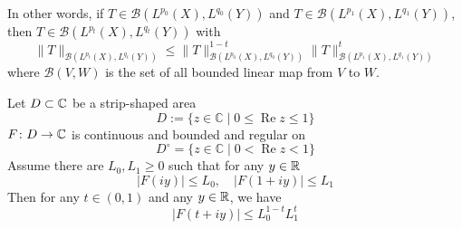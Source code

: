 \begin{rmk}
	In other words, if $T \in \mathcal{B}\left(L^{p_0}(X), L^{q_0}(Y)\right)$ and $T \in \mathcal{B}\left(L^{p_1}(X), L^{q_1}(Y)\right)$, then $T \in \mathcal{B}\left(L^{p_t}(X), L^{q_t}(Y)\right)$ with
	\begin{equation*}
		\|T\|_{\mathcal{B}\left(L^{p_t}(X), L^{q_t}(Y)\right)} \leq\|T\|_{\mathcal{B}\left(L^{p_0}(X), L^{q_0}(Y)\right)}^{1-t}\|T\|_{\mathcal{B}\left(L^{p_1}(X), L^{q_1}(Y)\right)}^t
	\end{equation*}
	where $\mathcal{B}(V,W)$ is the set of all bounded linear map from $V$ to $W$.
\end{rmk}

\begin{prop}\label{prop:threelines}
	Let $D \subset \mathbb{C}$ be a strip-shaped area
	\begin{equation*}
		D:=\{z \in \mathbb{C} \mid 0 \leq \operatorname{Re} z \leq 1\}
	\end{equation*}
	$F \colon D \rightarrow \mathbb{C}$ is continuous and bounded and regular on
	\begin{equation*}
		D^{\circ}=\{z \in \mathbb{C} \mid 0<\operatorname{Re} z<1\}
	\end{equation*}
	Assume there are $L_0,L_1 \geq 0$ such that for any $y \in \mathbb{R}$
	\begin{equation*}
		|F(i y)| \leq L_0, \quad|F(1+i y)| \leq L_1
	\end{equation*}
	Then for any $t \in (0,1)$ and any $y \in \mathbb{R}$, we have
	\begin{equation*}
		|F(t+i y)| \leq L_0^{1-t} L_1^t
	\end{equation*}
\end{prop}
